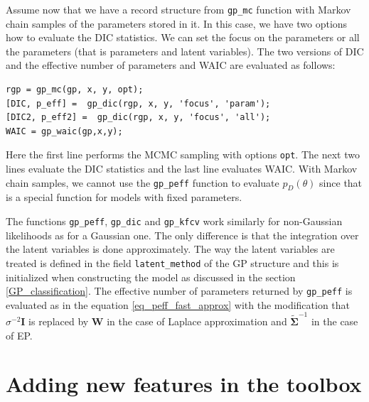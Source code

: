 \documentclass[twoside,11pt]{article}
\newcommand{\mb}{\mathbf}
\newcommand{\code}[1]{{\normalfont\texttt{#1}}}
\begin{document}
Assume now that we have a record structure from \code{gp\_mc}
function with Markov chain samples of the parameters stored in it.
In this case, we have two options how to evaluate the DIC
statistics. We can set the focus on the parameters or all the
parameters (that is parameters and latent variables). The two
versions of DIC and the effective number of parameters and WAIC are
evaluated as follows:
%
\begin{verbatim}
rgp = gp_mc(gp, x, y, opt);
[DIC, p_eff] =  gp_dic(rgp, x, y, 'focus', 'param');
[DIC2, p_eff2] =  gp_dic(rgp, x, y, 'focus', 'all');
WAIC = gp_waic(gp,x,y);
\end{verbatim}
% 
Here the first line performs the MCMC sampling with options
\code{opt}. The next two lines evaluate the DIC statistics and the
last line evaluates WAIC. With Markov chain samples, we cannot use
the \code{gp\_peff} function to evaluate $p_{D}(\theta)$ since that
is a special function for models with fixed parameters.

The functions \code{gp\_peff}, \code{gp\_dic} and \code{gp\_kfcv} work
similarly for non-Gaussian likelihoods as for a Gaussian one. The only
difference is that the integration over the latent variables is done
approximately.  The way the latent variables are treated is defined in
the field \code{latent\_method} of the GP structure and this is
initialized when constructing the model as discussed in the section
\ref{GP_classification}. The effective number of parameters returned
by \code{gp\_peff} is evaluated as in the equation
\eqref{eq_peff_fast_approx} with the modification that
$\sigma^{-2}\mb{I}$ is replaced by $\mb{W}$ in the case of Laplace
approximation and $\tilde{\mb{\Sigma}}^{-1}$ in the case of EP.



\section{Adding new features in the toolbox}\label{sec_adding_new_features}
\end{document}

